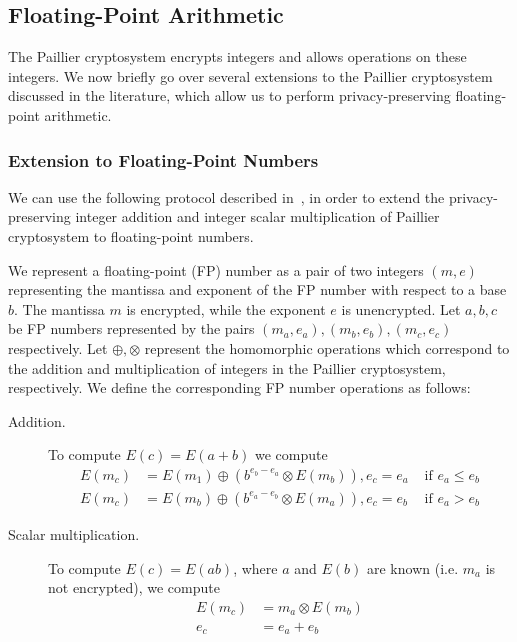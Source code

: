 \subsection{Floating-Point Arithmetic}
The Paillier cryptosystem encrypts integers and allows operations on these integers. We now briefly go over several extensions to the Paillier cryptosystem discussed in the literature, which allow us to perform privacy-preserving floating-point arithmetic.

\subsubsection{Extension to Floating-Point Numbers}
\label{sec:fp_operations}
We can use the following protocol described in~\cite{ziad_cryptoimg:_2016}, in order to extend the privacy-preserving integer addition and integer scalar multiplication of Paillier cryptosystem to floating-point numbers.

We represent a floating-point (FP) number as a pair of two integers $(m,e)$ representing the mantissa and exponent of the FP number with respect to a base $b$. The mantissa $m$ is encrypted, while the exponent $e$ is unencrypted.
Let $a,b,c$ be FP numbers represented by the pairs $(m_a,e_a),(m_b,e_b),(m_c,e_c)$ respectively. Let $\oplus,\otimes$ represent the homomorphic operations which correspond to the addition and multiplication of integers in the Paillier cryptosystem, respectively. We define the corresponding FP number operations as follows:
\begin{description}
  \item[Addition.]
    To compute $E(c)=E(a+b)$ we compute
    \begin{align*}
      E(m_c) &= E(m_1) \oplus (b^{e_b-e_a} \otimes E(m_b)), e_c = e_a & \text{ if } e_a \leq e_b \\
      E(m_c) &= E(m_b) \oplus (b^{e_a-e_b} \otimes E(m_a)), e_c = e_b & \text{ if } e_a > e_b
    \end{align*}
  \item[Scalar multiplication.]
    To compute $E(c) = E(ab)$, where $a$ and $E(b)$ are known (i.e. $m_a$ is not encrypted), we compute
    \begin{align*}
      E(m_c) &= m_a \otimes E(m_b)\\
      e_c &= e_a + e_b
    \end{align*}
\end{description}
